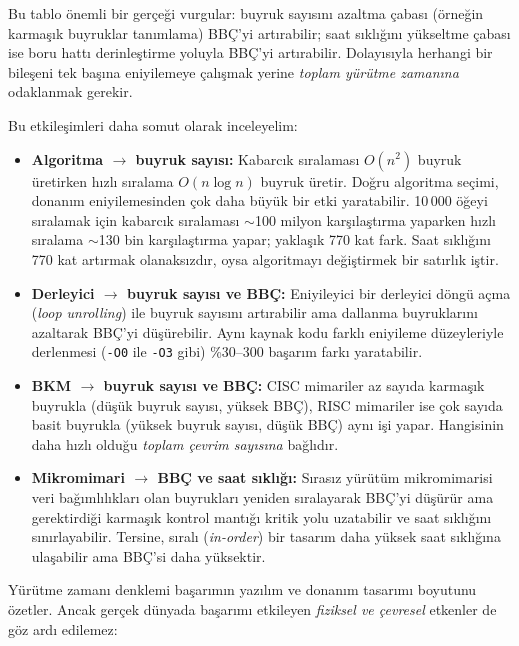 \noindent Bu tablo önemli bir gerçeği vurgular: buyruk sayısını azaltma çabası (örneğin karmaşık buyruklar tanımlama) BBÇ'yi artırabilir; saat sıklığını yükseltme çabası ise boru hattı derinleştirme yoluyla BBÇ'yi artırabilir. Dolayısıyla herhangi bir bileşeni tek başına eniyilemeye çalışmak yerine \emph{toplam yürütme zamanına} odaklanmak gerekir.

Bu etkileşimleri daha somut olarak inceleyelim:
\begin{itemize}
    \item \textbf{Algoritma $\rightarrow$ buyruk sayısı:} Kabarcık sıralaması $O(n^2)$ buyruk üretirken hızlı sıralama $O(n \log n)$ buyruk üretir. Doğru algoritma seçimi, donanım eniyilemesinden çok daha büyük bir etki yaratabilir. 10\,000 öğeyi sıralamak için kabarcık sıralaması $\sim$100 milyon karşılaştırma yaparken hızlı sıralama $\sim$130 bin karşılaştırma yapar; yaklaşık 770 kat fark. Saat sıklığını 770 kat artırmak olanaksızdır, oysa algoritmayı değiştirmek bir satırlık iştir.

    \item \textbf{Derleyici $\rightarrow$ buyruk sayısı ve BBÇ:} Eniyileyici bir derleyici döngü açma (\emph{loop unrolling}) ile buyruk sayısını artırabilir ama dallanma buyruklarını azaltarak BBÇ'yi düşürebilir. Aynı kaynak kodu farklı eniyileme düzeyleriyle derlenmesi (\texttt{-O0} ile \texttt{-O3} gibi) \%30--300 başarım farkı yaratabilir.

    \item \textbf{BKM $\rightarrow$ buyruk sayısı ve BBÇ:} CISC mimariler az sayıda karmaşık buyrukla (düşük buyruk sayısı, yüksek BBÇ), RISC mimariler ise çok sayıda basit buyrukla (yüksek buyruk sayısı, düşük BBÇ) aynı işi yapar. Hangisinin daha hızlı olduğu \emph{toplam çevrim sayısına} bağlıdır.

    \item \textbf{Mikromimari $\rightarrow$ BBÇ ve saat sıklığı:} Sırasız yürütüm mikromimarisi veri bağımlılıkları olan buyrukları yeniden sıralayarak BBÇ'yi düşürür ama gerektirdiği karmaşık kontrol mantığı kritik yolu uzatabilir ve saat sıklığını sınırlayabilir. Tersine, sıralı (\emph{in-order}) bir tasarım daha yüksek saat sıklığına ulaşabilir ama BBÇ'si daha yüksektir.
\end{itemize}

Yürütme zamanı denklemi başarımın yazılım ve donanım tasarımı boyutunu özetler. Ancak gerçek dünyada başarımı etkileyen \emph{fiziksel ve çevresel} etkenler de göz ardı edilemez:

